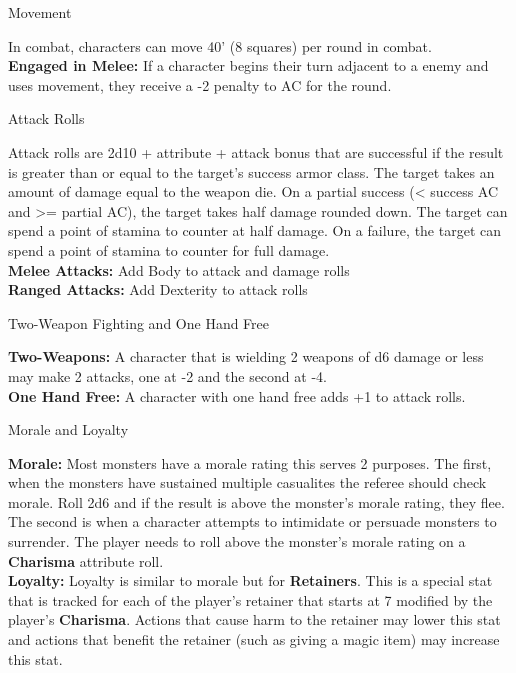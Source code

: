 \begin{mercHeading}
Movement
\end{mercHeading}
In combat, characters can move 40' (8 squares) per round in combat. \\
\textbf{Engaged in Melee:} If a character begins their turn adjacent to a enemy and uses movement, they receive a -2 penalty to AC for the round.

\begin{mercHeading}
Attack Rolls
\end{mercHeading}
\label{label:atkroll}
Attack rolls are 2d10 + attribute + attack bonus that are successful if the result is greater than or equal to the target's success armor class. The target takes an amount of damage equal to the weapon die. On a partial success (< success AC and >= partial AC), the target takes half damage rounded down. 
The target can spend a point of stamina to counter at half damage. On a failure, the target can spend a point of stamina to counter for full damage. \\
\textbf{Melee Attacks:} Add Body to attack and damage rolls \\
\textbf{Ranged Attacks:} Add Dexterity to attack rolls

\begin{mercHeading}
Two-Weapon Fighting and One Hand Free
\end{mercHeading}
\textbf{Two-Weapons:} A character that is wielding 2 weapons of d6 damage or less may make 2 attacks, one at -2 and the second at -4. \\
\textbf{One Hand Free:} A character with one hand free adds +1 to attack rolls.


\begin{mercHeading}
Morale and Loyalty
\end{mercHeading}
\textbf{Morale:} Most monsters have a morale rating this serves 2 purposes. The first, when the monsters have sustained multiple casualites the referee should check morale. Roll 2d6 and if the result is above the monster's morale rating, they flee. The second is when a character attempts to intimidate or persuade monsters to surrender. The player needs to roll above the monster's morale rating on a \textbf{Charisma} attribute roll.\\
\textbf{Loyalty:} Loyalty is similar to morale but for \textbf{Retainers}. This is a special stat that is tracked for each of the player's retainer that starts at 7 modified by the player's \textbf{Charisma}. Actions that cause harm to the retainer may lower this stat and actions that benefit the retainer (such as giving a magic item) may increase this stat. 